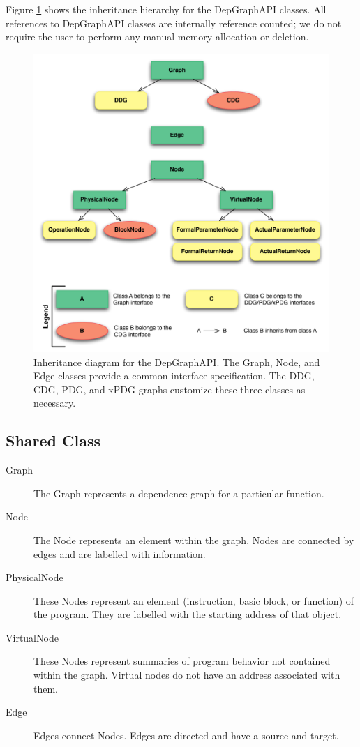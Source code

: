 \documentclass[12pt,titlepage]{article}
\begin{document}
Figure \ref{inheritance} shows the inheritance hierarchy for the
DepGraphAPI classes. All references to DepGraphAPI classes are
internally reference counted; we do not require the user to perform
any manual memory allocation or deletion.

\begin{figure}
\begin{center}
\includegraphics[scale=0.75]{figs/Inheritance.pdf}
\caption{Inheritance diagram for the DepGraphAPI. The Graph, Node, and
  Edge classes provide a common interface specification. The DDG, CDG,
  PDG, and xPDG graphs customize these three classes as necessary.}
\end{center}
\label{inheritance}
\end{figure}

\subsection{Shared Class}

\begin{description}
\item[Graph] The Graph represents a dependence graph for a particular
function.
\item[Node] The Node represents an element within the graph. Nodes are
connected by edges and are labelled with information.
\item[PhysicalNode] These Nodes represent an element (instruction,
basic block, or function) of the program. They are labelled with the
starting address of that object.
\item[VirtualNode] These Nodes represent summaries of program behavior
not contained within the graph. Virtual nodes do not have an address
associated with them.
\item[Edge] Edges connect Nodes. Edges are directed and have a source
and target.
\end{description}
\end{document}
